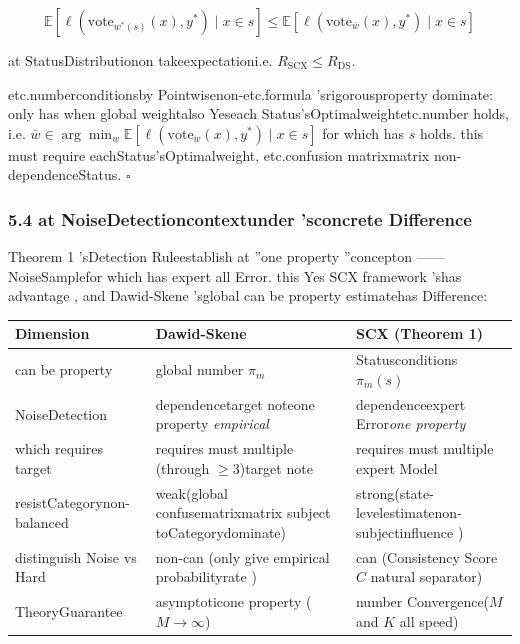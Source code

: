 \documentclass[
  12pt,
]{article}
\begin{document}
\[\mathbb{E}[\ell(\text{vote}_{w^*(s)}(x), y^*) \mid x \in s] \leq \mathbb{E}[\ell(\text{vote}_{\bar{w}}(x), y^*) \mid x \in s]\]

at StatusDistributionon takeexpectationi.e. \(R_{\text{SCX}} \leq R_{\text{DS}}\). 

etc.numberconditionsby Pointwisenon-etc.formula 'srigorousproperty dominate: only has when global weightalso Yeseach Status'sOptimalweightetc.number holds, i.e.
\(\bar{w} \in \arg\min_{w} \mathbb{E}[\ell(\text{vote}_w(x), y^*) \mid x \in s]\)
for which has  \(s\)
holds. this must require eachStatus'sOptimalweight, etc.confusion matrixmatrix non-dependenceStatus. \(\square\)

\subsubsection{5.4
at NoiseDetectioncontextunder 'sconcrete Difference}\label{ux5728ux566aux58f0ux68c0ux6d4bux8bedux5883ux4e0bux7684ux5177ux4f53ux5deeux5f02}

Theorem 1
'sDetection Ruleestablish at ''one property ''concepton ------NoiseSamplefor which has expert all Error. this Yes
SCX framework 'shas advantage , and  Dawid-Skene 'sglobal can be property estimatehas Difference: 

\begin{longtable}[]{@{}
  >{\raggedright\arraybackslash}p{}
  >{\raggedright\arraybackslash}p{}
  >{\raggedright\arraybackslash}p{}@{}}
\toprule\noalign{}
\begin{minipage}[b]{\linewidth}\raggedright
Dimension
\end{minipage} & \begin{minipage}[b]{\linewidth}\raggedright
Dawid-Skene
\end{minipage} & \begin{minipage}[b]{\linewidth}\raggedright
SCX (Theorem 1)
\end{minipage} \\
\midrule\noalign{}
\endhead
\bottomrule\noalign{}
\endlastfoot
can be property  & global number  \(\pi_m\) & Statusconditions \(\pi_m(s)\) \\
NoiseDetection & dependencetarget noteone property \emph{empirical} & dependenceexpert Error\emph{one property } \\
which requires target  & requires must multiple (through \(\geq 3\))target note & requires must multiple expert Model \\
resistCategorynon-balanced & weak(global confusematrixmatrix subject toCategorydominate) &
strong(state-levelestimatenon-subjectinfluence ) \\
distinguish Noise vs Hard & non-can (only give empirical probabilityrate ) & can (Consistency Score \(C\)
natural separator) \\
TheoryGuarantee & asymptoticone property (\(M \to \infty\)) & number Convergence(\(M\) and  \(K\)
all speed) \\
\end{longtable}
\end{document}
